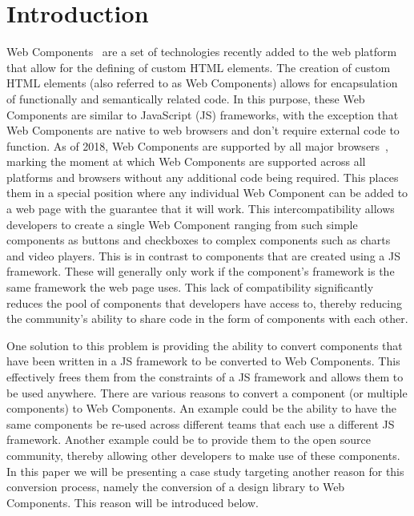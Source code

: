 \chapter{Introduction}
Web Components~ are a set of technologies recently added to the web platform that allow for the defining of custom HTML elements. The creation of custom HTML elements (also referred to as Web Components) allows for encapsulation of functionally and semantically related code. In this purpose, these Web Components are similar to JavaScript (JS) frameworks, with the exception that Web Components are native to web browsers and don't require external code to function. As of 2018, Web Components are supported by all major browsers~, marking the moment at which Web Components are supported across all platforms and browsers without any additional code being required. This places them in a special position where any individual Web Component can be added to a web page with the guarantee that it will work. This intercompatibility allows developers to create a single Web Component ranging from such simple components as buttons and checkboxes to complex components such as charts and video players. This is in contrast to components that are created using a JS framework. These will generally only work if the component's framework is the same framework the web page uses. This lack of compatibility significantly reduces the pool of components that developers have access to, thereby reducing the community's ability to share code in the form of components with each other.

One solution to this problem is providing the ability to convert components that have been written in a JS framework to be converted to Web Components. This effectively frees them from the constraints of a JS framework and allows them to be used anywhere. There are various reasons to convert a component (or multiple components) to Web Components. An example could be the ability to have the same components be re-used across different teams that each use a different JS framework. Another example could be to provide them to the open source community, thereby allowing other developers to make use of these components. In this paper we will be presenting a case study targeting another reason for this conversion process, namely the conversion of a design library to Web Components. This reason will be introduced below.

